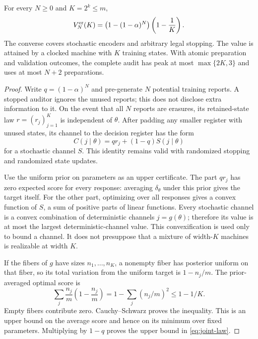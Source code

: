 \begin{theorem}\label{thm:joint-law}
For every $N\ge0$ and $K=2^k\le m$,
\begin{equation}\label{eq:joint-law}
 V_N^{\rm er}(K)=\bigl(1-(1-\alpha)^N\bigr)\left(1-\frac1K\right).
\end{equation}
The converse covers stochastic encoders and arbitrary legal stopping.
The value is attained by a clocked machine with $K$ training states.
With atomic preparation and validation outcomes, the complete audit
has peak at most $\max\{2K,3\}$ and uses at most $N+2$ preparations.
\end{theorem}
\begin{proof}
Write $q=(1-\alpha)^N$ and pre-generate $N$ potential training reports.
A stopped auditor ignores the unused reports; this does not disclose
extra information to it. On the event that all $N$ reports are erasures,
its retained-state law $r=(r_j)_{j=1}^K$ is independent of $\theta$.
After padding any smaller register with unused states, its channel to
the decision register has the form
\begin{equation}\label{eq:erasure-channel}
    C(j\mid\theta)=q r_j+(1-q)S(j\mid\theta)
\end{equation}
for a stochastic channel $S$. This identity remains valid with randomized
stopping and randomized state updates.

Use the uniform prior on parameters as an upper certificate. The part
$q r_j$ has zero expected score for every response: averaging
$\delta_\theta$ under this prior gives the target itself. For the other
part, optimizing over all responses gives a convex function of $S$, a
sum of positive parts of linear functions. Every stochastic channel
is a convex combination of deterministic channels $j=g(\theta)$;
therefore its value is at most the largest deterministic-channel value.
This convexification is used only to bound a channel. It does not
presuppose that a mixture of width-$K$ machines is realizable at width
$K$.

If the fibers of $g$ have sizes $n_1,\ldots,n_K$, a nonempty fiber has
posterior uniform on that fiber, so its total variation from the uniform
target is $1-n_j/m$. The prior-averaged optimal score is
\[
 \sum_j\frac{n_j}{m}\left(1-\frac{n_j}{m}\right)
    =1-\sum_j(n_j/m)^2\le1-1/K.
\]
Empty fibers contribute zero. Cauchy--Schwarz proves the inequality.
This is an upper bound on the average score and hence on its minimum
over fixed parameters. Multiplying by $1-q$ proves the upper bound in
\eqref{eq:joint-law}.


\end{proof}
